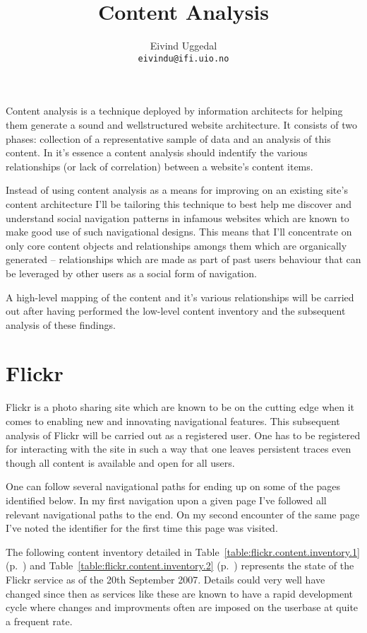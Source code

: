 \documentclass[11pt,a4paper]{article}
\title{Content Analysis}
\author{Eivind Uggedal\\
        \texttt{eivindu@ifi.uio.no}}
\date{}
\begin{document}
\maketitle{}

Content analysis is a technique deployed by information architects for helping
them generate a sound and wellstructured website architecture. It consists of
two phases: collection of a representative sample of data and an analysis of
this content. In it's essence a content analysis should indentify the various
relationships (or lack of correlation) between a website's content items.

Instead of using content analysis as a means for improving on an existing
site's content architecture I'll be tailoring this technique to best help me
discover and understand social navigation patterns in infamous websites which
are known to make good use of such navigational designs. This means that I'll
concentrate on only core content objects and relationships amongs them
which are organically generated -- relationships which are made as part of
past users behaviour that can be leveraged by other users as a social form
of navigation.

A high-level mapping of the content and it's various relationships
will be carried out after having performed the low-level content inventory
and the subsequent analysis of these findings.

\section{Flickr}

Flickr is a photo sharing site which are known to be on the cutting edge when
it comes to enabling new and innovating navigational features. This subsequent
analysis of Flickr will be carried out as a registered user. One has to be
registered for interacting with the site in such a way that one leaves
persistent traces even though all content is available and open for all users.

One can follow several navigational paths for ending up on some of the pages
identified below. In my first navigation upon a given page I've followed all
relevant navigational paths to the end. On my second encounter of the same
page I've noted the identifier for the first time this page was visited.

The following content inventory detailed in
Table~\ref{table:flickr.content.inventory.1}
(p.~\pageref{table:flickr.content.inventory.1}) and
Table~\ref{table:flickr.content.inventory.2}
(p.~\pageref{table:flickr.content.inventory.2})
represents the state of the Flickr service as of the 20th September 2007.
Details could very well have changed since then as
services like these are known to have a rapid development cycle
where changes and improvments often are imposed on the userbase at quite
a frequent rate.
\end{document}
